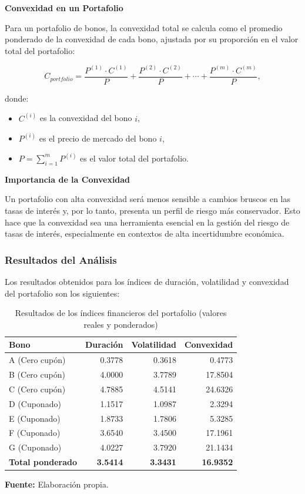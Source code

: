\documentclass[12pt]{article}
\begin{document}
\noindent \textbf{Convexidad en un Portafolio}

Para un portafolio de bonos, la convexidad total se calcula como el promedio ponderado de la convexidad de cada bono, ajustada por su proporción en el valor total del portafolio:

\[
C_{portfolio} = \frac{P^{(1)} \cdot C^{(1)}}{P} + \frac{P^{(2)} \cdot C^{(2)}}{P} + \cdots + \frac{P^{(m)} \cdot C^{(m)}}{P},
\]

donde:
\begin{itemize}
    \item \(C^{(i)}\) es la convexidad del bono \(i\),
    \item \(P^{(i)}\) es el precio de mercado del bono \(i\),
    \item \(P = \sum_{i=1}^m P^{(i)}\) es el valor total del portafolio.
\end{itemize}

\noindent \textbf{Importancia de la Convexidad}

Un portafolio con alta convexidad será menos sensible a cambios bruscos en las tasas de interés y, por lo tanto, presenta un perfil de riesgo más conservador. Esto hace que la convexidad sea una herramienta esencial en la gestión del riesgo de tasas de interés, especialmente en contextos de alta incertidumbre económica.

\subsubsection{Resultados del Análisis}

Los resultados obtenidos para los índices de duración, volatilidad y convexidad del portafolio son los siguientes:

\begin{table}[H]
\centering
\caption{Resultados de los índices financieros del portafolio (valores reales y ponderados)}
\begin{tabular}{lrrr}
\hline \hline
\textbf{Bono} & \textbf{Duración} & \textbf{Volatilidad} & \textbf{Convexidad} \\ 
\midrule
A (Cero cupón) & 0.3778 & 0.3618 & 0.4773 \\
B (Cero cupón) & 4.0000 & 3.7789 & 17.8504 \\
C (Cero cupón) & 4.7885 & 4.5141 & 24.6326 \\
D (Cuponado)   & 1.1517 & 1.0987 & 2.3294 \\
E (Cuponado)   & 1.8733 & 1.7806 & 5.3285 \\
F (Cuponado)   & 3.6540 & 3.4500 & 17.1961 \\
G (Cuponado)   & 4.0227 & 3.7920 & 21.1434 \\
\midrule
\textbf{Total ponderado} & \textbf{3.5414} & \textbf{3.3431} & \textbf{16.9352} \\
\hline \hline
\end{tabular}
\begin{tablenotes}
	\item[] \small\textbf{Fuente:} Elaboración propia.
\end{tablenotes}
\end{table}
\end{document}
